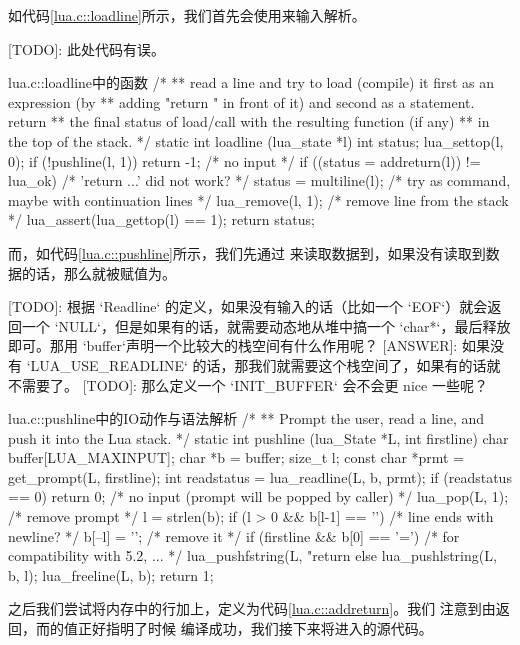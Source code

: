 如代码\ref{lua.c::loadline}所示，我们首先会使用来输入解析。

[TODO]: 此处代码有误。

\begin{ccode}{lua.c::loadline}{中的函数}
/*
** read a line and try to load (compile) it first as an expression (by
** adding "return " in front of it) and second as a statement. return
** the final status of load/call with the resulting function (if any)
** in the top of the stack.
*/
static int loadline (lua_state *l) {
  int status;
  lua_settop(l, 0);
  if (!pushline(l, 1))
    return -1;  /* no input */
  if ((status = addreturn(l)) != lua_ok)  /* 'return ...' did not work? */
    status = multiline(l);  /* try as command, maybe with continuation lines */
  lua_remove(l, 1);  /* remove line from the stack */
  lua_assert(lua_gettop(l) == 1);
  return status;
}
\end{ccode}

而，如代码\ref{lua.c::pushline}所示，我们先通过
来读取数据到，如果没有读取到数据的话，那么就被赋值为。

[TODO]: 根据 `Readline` 的定义，如果没有输入的话（比如一个 `EOF`）就会返回一个
`NULL`，但是如果有的话，就需要动态地从堆中搞一个 `char*`，最后释放即可。那用
`buffer`声明一个比较大的栈空间有什么作用呢？
[ANSWER]: 如果没有 `LUA\_USE\_READLINE` 的话，那我们就需要这个栈空间了，如果有的话就
不需要了。
[TODO]: 那么定义一个 `INIT\_BUFFER` 会不会更 nice 一些呢？

\begin{ccode}{lua.c::pushline}{中的IO动作与语法解析}
/*
** Prompt the user, read a line, and push it into the Lua stack.
*/
static int pushline (lua_State *L, int firstline) {
  char buffer[LUA_MAXINPUT];
  char *b = buffer;
  size_t l;
  const char *prmt = get_prompt(L, firstline);
  int readstatus = lua_readline(L, b, prmt);
  if (readstatus == 0)
    return 0;  /* no input (prompt will be popped by caller) */
  lua_pop(L, 1);  /* remove prompt */
  l = strlen(b);
  if (l > 0 && b[l-1] == '\n')  /* line ends with newline? */
    b[--l] = '\0';  /* remove it */
  if (firstline && b[0] == '=')  /* for compatibility with 5.2, ... */
    lua_pushfstring(L, "return %
  else
    lua_pushlstring(L, b, l);
  lua_freeline(L, b);
  return 1;
}
\end{ccode}

之后我们尝试将内存中的行加上，定义为代码\ref{lua.c::addreturn}。我们
注意到由返回，而的值正好指明了时候
编译成功，我们接下来将进入的源代码。

